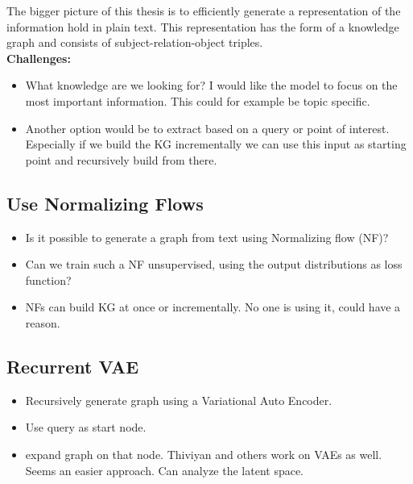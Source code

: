 

The bigger picture of this thesis is to efficiently generate a representation of the information hold in plain text. This representation has the form of a knowledge graph and consists of subject-relation-object triples.
\\
\textbf{Challenges:}\\
\begin{itemize}
    \item What knowledge are we looking for?
    I would like the model to focus on the most important information. This could for example be topic specific.
    \item Another option would be to extract based on a query or point of interest.
    Especially if we build the KG incrementally we can use this input as starting point and recursively build from there. 
\end{itemize}


\subsection{Use Normalizing Flows}\label{idea:NF}

\begin{itemize}
    \item Is it possible to generate a graph from text using Normalizing flow (NF)?
    \item Can we train such a NF unsupervised, using the output distributions as loss function?
    \item NFs can build KG at once or incrementally.
No one is using it, could have a reason.
\end{itemize}

    
\subsection{Recurrent VAE}\label{idea:VAE}

\begin{itemize}
    \item Recursively generate graph using a Variational Auto Encoder.
    \item Use query as start node.
    \item expand graph on that node.
Thiviyan and others work on VAEs as well.
Seems an easier approach.
Can analyze the latent space.

\end{itemize}

